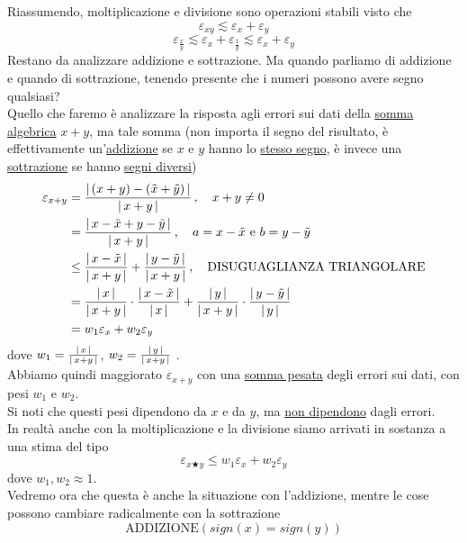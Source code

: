 \documentclass[12pt]{article}
\DeclarePairedDelimiter{\abs}{\lvert}{\rvert}
\begin{document}
Riassumendo, moltiplicazione e divisione sono operazioni stabili visto che 
\[\varepsilon_{xy} \lesssim \varepsilon_x + \varepsilon_y\]
\[\varepsilon_{\frac{x}{y}} \lesssim \varepsilon_x + \varepsilon_{\frac{1}{y}} \lesssim  \varepsilon_x + \varepsilon_y\]
Restano da analizzare addizione e sottrazione. Ma quando parliamo di addizione e quando di sottrazione, tenendo presente che i numeri possono avere segno qualsiasi?\\
Quello che faremo è analizzare la risposta agli errori sui dati della \underline{somma algebrica} $x + y$, ma tale somma (non importa il segno del risultato, è effettivamente un'\underline{addizione} se $x$ e $y$ hanno lo \underline{stesso segno}, è invece una \underline{sottrazione} se hanno \underline{segni diversi})
\[\begin{split}
    \varepsilon_{x+y} & = \frac{\abs*{\,(x + y) - (\Tilde{x} + \Tilde{y})\,}}{\abs*{\,x + y\,}} \,, \quad x + y \ne 0 \\
    & = \frac{\abs*{\,x - \Tilde{x} + y - \Tilde{y}\,}}{\abs*{\,x + y\,}} \,, \quad a = x - \Tilde{x} \text{ e } b = y - \Tilde{y} \\
    & \le \frac{\abs*{\,x - \Tilde{x}\,}}{\abs*{\,x + y\,}} + \frac{\abs*{\,y - \Tilde{y}\,}}{\abs*{\,x + y\,}} \,, \quad \text{DISUGUAGLIANZA TRIANGOLARE} \\
    & = \frac{\abs*{\,x\,}}{\abs*{\,x + y\,}} \cdot \frac{\abs*{\,x - \Tilde{x}\,}}{\abs*{\,x\,}} + \frac{\abs*{\,y\,}}{\abs*{\,x + y\,}} \cdot \frac{\abs*{\,y - \Tilde{y}\,}}{\abs*{\,y\,}} \\
    & = w_1 \varepsilon_x + w_2 \varepsilon_y
\end{split}\]
dove $w_1 = \frac{\abs*{\,x\,}}{\abs*{\,x + y\,}}$, $w_2 = \frac{\abs*{\,y\,}}{\abs*{\,x + y\,}}$ .\\
Abbiamo quindi maggiorato $\varepsilon_{x+y}$ con una \underline{somma pesata} degli errori sui dati, con pesi $w_1$ e $w_2$.\\
Si noti che questi pesi dipendono da $x$ e da $y$, ma \underline{non dipendono} dagli errori.\\
In realtà anche con la moltiplicazione e la divisione siamo arrivati in sostanza a una stima del tipo
\[\varepsilon_{x \bigstar y} \le w_1 \varepsilon_x + w_2 \varepsilon_y\]
dove $w_1, w_2 \approx 1$. \\
Vedremo ora che questa è anche la situazione con l’addizione, mentre le cose possono cambiare radicalmente con la sottrazione \\
\[\text{ADDIZIONE} (sign(x) = sign(y))\]
\end{document}
